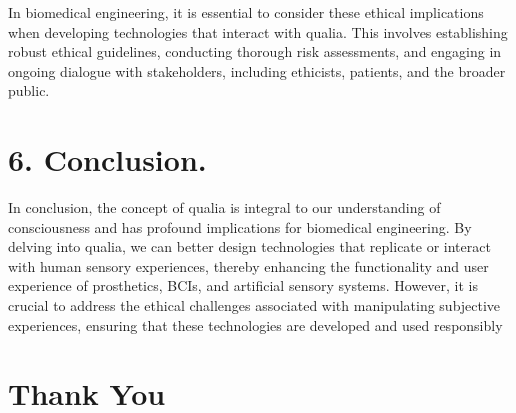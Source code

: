 \documentclass{article}
\begin{document}
In biomedical engineering, it is essential to consider these ethical implications when developing technologies that interact with qualia. This involves establishing robust ethical guidelines, conducting thorough risk assessments, and engaging in ongoing dialogue with stakeholders, including ethicists, patients, and the broader public.


\section*{6.  Conclusion.}
In conclusion, the concept of qualia is integral to our understanding of consciousness and has profound implications for biomedical engineering. By delving into qualia, we can better design technologies that replicate or interact with human sensory experiences, thereby enhancing the functionality and user experience of prosthetics, BCIs, and artificial sensory systems. However, it is crucial to address the ethical challenges associated with manipulating subjective experiences, ensuring that these technologies are developed and used responsibly



\section* {Thank You}
\end{document}
